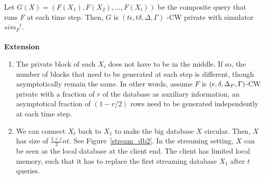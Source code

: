 \documentclass[11pt]{article}
\begin{document}
Let $G(X) = (F(X_{1}), F(X_{2}) , \dots, F(X_{t}))$ be the composite query that runs $F$ at each time step. Then, $G$ is $(t\epsilon, t \delta, \Delta, \Gamma)$ -CW private with simulator ${sim_{F}}^{t}$.
\\
\\
{\bf Extension}\\
\begin{enumerate}
\item The private block of each $X_{i}$ does not have to be in the middle. If so, the number of blocks that need to be generated at each step is different, though asymptotically remain the same. In other words, assume $F$ is $(\epsilon, \delta, \Delta_{F}, \Gamma)$-CW private with a fraction of $r$ of the database as auxiliary information, an asymptotical fraction of $(1-r/2)$ rows need to be generated independently at each time step.
\item We can connect $X_{t}$ back to $X_{1}$ to make the big database $X$ circular. Then, $X$ has size of $\frac{1+c}{2}nt$. See Figure~\ref{stream_db2}. In the streaming setting, $X$ can be seen as the local database at the client end. The client has limited local memory, such that it has to replace the first streaming database $X_{1}$ after $t$ queries. 
\end{enumerate}
\end{document}
